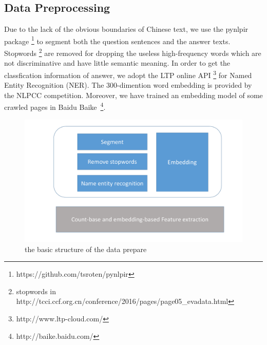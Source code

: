 \documentclass{llncs}
\begin{document}
\subsection{Data Preprocessing}
\label{sec:preprocess}

Due to the lack of the obvious boundaries of Chinese text, we use the pynlpir package \footnote{https://github.com/tsroten/pynlpir} \cite{Liu2010Language} to segment both the question sentences and the answer texts. Stopwords \footnote{stopwords in http://tcci.ccf.org.cn/conference/2016/pages/page05\_evadata.html} are removed for dropping the useless high-frequency words which are not discriminative and have little semantic meaning. In order to get the classfication information of answer, we adopt the LTP online API \footnote{http://www.ltp-cloud.com/} for Named Entity Recognition (NER). The 300-dimention word embedding is provided by the NLPCC competition. Moreover, we have trained {\color{red}an} embedding model of some crawled pages in Baidu Baike~\footnote{http://baike.baidu.com/}. 
\begin{figure}
\centering
\includegraphics[width=12cm]{figures/structure.pdf}
\caption{the basic structure of the data prepare}
\label{fig:structure}
\end{figure}



\end{document}
